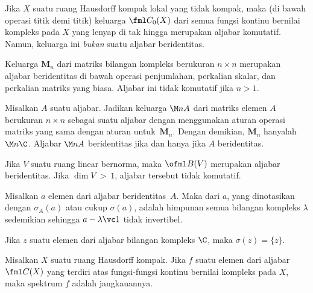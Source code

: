 \begin{exam} Jika $X$ suatu ruang Hausdorff kompak lokal yang tidak kompak, maka (di bawah
operasi titik demi titik) keluarga $\fml C_0(X)$ dari semua fungsi kontinu bernilai kompleks
pada $X$ yang lenyap di tak hingga merupakan aljabar komutatif.
Namun, keluarga ini \emph{bukan} suatu
aljabar beridentitas.
\end{exam}

\begin{exam}\label{000533} Keluarga
$\mathbf M_n$ dari matriks bilangan kompleks berukuran $n \times n$ merupakan
aljabar beridentitas di bawah operasi penjumlahan, perkalian skalar, dan perkalian matriks yang biasa.
Aljabar ini tidak komutatif jika $n > 1$.
\end{exam}

\begin{exam}\label{000533a} Misalkan $A$ suatu aljabar. Jadikan keluarga
$\M n{A}$ dari matriks elemen $A$ berukuran $n \times n$ sebagai suatu
aljabar dengan menggunakan aturan operasi matriks yang sama dengan aturan untuk~$\mathbf M_n$.
Dengan demikian, $\mathbf M_n$ hanyalah $\M n\C$. Aljabar $\M nA$ beridentitas jika dan hanya jika $A$ beridentitas.
\end{exam}

\begin{exam}\label{000534} Jika $V$ suatu ruang linear bernorma, maka
$\ofml B(V)$ merupakan aljabar beridentitas. Jika $\dim V~>~1$, aljabar tersebut tidak komutatif.
\end{exam}

\begin{defn}\label{000535} Misalkan $a$ elemen dari aljabar beridentitas~$A$. Maka
 dari $a$, yang dinotasikan dengan
$\sigma_A(a)$ atau cukup $\sigma(a)$, adalah himpunan semua bilangan kompleks $\lambda$ sedemikian sehingga
$a - \lambda\vc 1$ tidak invertibel.
\end{defn}

\begin{exam} Jika $z$ suatu elemen dari aljabar bilangan kompleks $\C$, maka
$\sigma(z) = \{z\}$.
\end{exam}

\begin{exam}\label{0005712} Misalkan $X$ suatu ruang Hausdorff kompak. Jika $f$ suatu elemen
dari aljabar $\fml C(X)$ yang terdiri atas fungsi-fungsi kontinu bernilai kompleks pada $X$, maka
spektrum $f$ adalah jangkauannya.
\end{exam}
